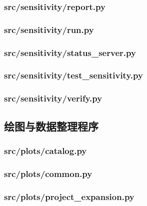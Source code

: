 \documentclass[zihao=-4,a4paper,UTF8,fontset=none]{ctexart}
\begin{document}
\subsubsection*{src/sensitivity/report.py}


\subsubsection*{src/sensitivity/run.py}


\subsubsection*{src/sensitivity/status\_server.py}


\subsubsection*{src/sensitivity/test\_sensitivity.py}


\subsubsection*{src/sensitivity/verify.py}


\subsection{绘图与数据整理程序}
\subsubsection*{src/plots/catalog.py}


\subsubsection*{src/plots/common.py}


\subsubsection*{src/plots/project\_expansion.py}

\end{document}
